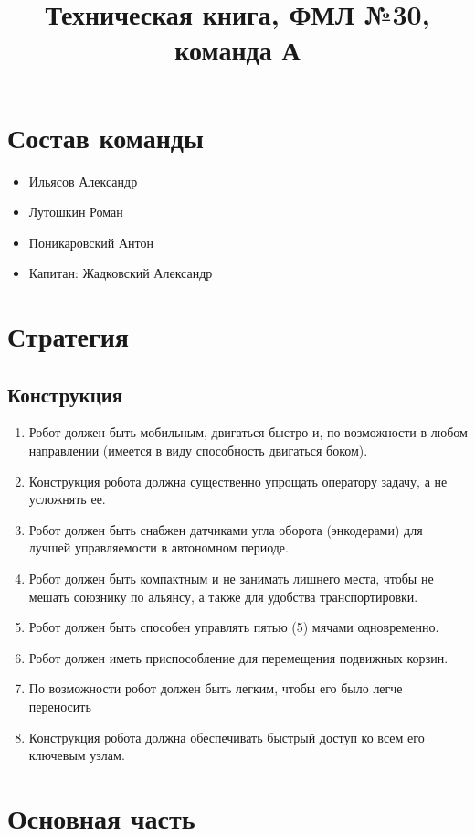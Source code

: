 \documentclass[12pt]{article}
\title{ Техническая книга, ФМЛ №30, команда А}
\begin{document}
	\maketitle
	\tableofcontents
	\newpage
	\section{Состав команды}
		\begin{itemize}
					\item Ильясов Александр
					\item Лутошкин Роман
					\item Поникаровский Антон
					\item Капитан: Жадковский Александр
		\end{itemize}
	\section{Стратегия}
		\subsection{Конструкция}
			\begin{enumerate}
					\item Робот должен быть мобильным, двигаться быстро и, по возможности в любом направлении (имеется в виду способность двигаться боком).
					\item Конструкция робота должна существенно упрощать оператору задачу, а не усложнять ее.
					\item Робот должен быть снабжен датчиками угла оборота (энкодерами) для лучшей управляемости в автономном периоде.
					\item Робот должен быть компактным и не занимать лишнего места, чтобы не мешать союзнику по альянсу, а также для удобства транспортировки.
					\item Робот должен быть способен управлять пятью (5) мячами одновременно.
					\item Робот должен иметь приспособление для перемещения подвижных корзин.
					\item По возможности робот должен быть легким, чтобы его было легче переносить
					\item Конструкция робота должна обеспечивать быстрый доступ ко всем его ключевым узлам.
			\end{enumerate}
	\section{Основная часть}
\end{document}
